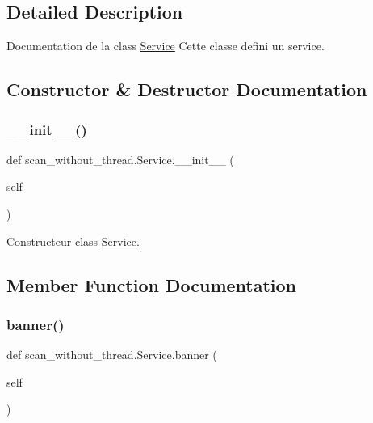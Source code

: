 \subsection{Detailed Description}
Documentation de la class \hyperlink{classscan__without__thread_1_1Service}{Service} Cette classe defini un service. 

\subsection{Constructor \& Destructor Documentation}
\hypertarget{classscan__without__thread_1_1Service_aa238b76a28ec8b49b504e9f27a57996d}{}\label{classscan__without__thread_1_1Service_aa238b76a28ec8b49b504e9f27a57996d} 
\subsubsection{\texorpdfstring{\+\_\+\+\_\+init\+\_\+\+\_\+()}{\_\_init\_\_()}}
{\footnotesize\ttfamily def scan\+\_\+without\+\_\+thread.\+Service.\+\_\+\+\_\+init\+\_\+\+\_\+ (\begin{DoxyParamCaption}\item[{}]{self }\end{DoxyParamCaption})}



Constructeur class \hyperlink{classscan__without__thread_1_1Service}{Service}. 



\subsection{Member Function Documentation}
\hypertarget{classscan__without__thread_1_1Service_ac9b3870d554e7388468d23940c3e3c82}{}\label{classscan__without__thread_1_1Service_ac9b3870d554e7388468d23940c3e3c82} 
\subsubsection{\texorpdfstring{banner()}{banner()}\hspace{0.1cm}{\footnotesize\ttfamily [1/2]}}
{\footnotesize\ttfamily def scan\+\_\+without\+\_\+thread.\+Service.\+banner (\begin{DoxyParamCaption}\item[{}]{self }\end{DoxyParamCaption})}



